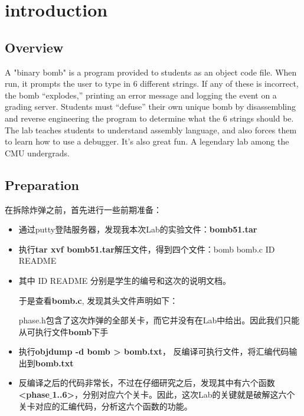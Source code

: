 \section{introduction}
	\subsection{Overview}
	A "binary bomb" is a program provided to students as an object code file. When run, it prompts the user to type in 6 different strings. If any of these is incorrect, the bomb ``explodes,'' printing an error message and logging the event on a grading server. Students must ``defuse'' their own unique bomb by disassembling and reverse engineering the program to determine what the 6 strings should be. The lab teaches students to understand assembly language, and also forces them to learn how to use a debugger. It's also great fun. A legendary lab among the CMU undergrads.
	\subsection{Preparation}
	在拆除炸弹之前，首先进行一些前期准备：
	\begin{itemize}
		\item	通过putty登陆服务器，发现我本次Lab的实验文件：\textbf{bomb51.tar}
		\item	执行\textbf{tar xvf bomb51.tar}解压文件，得到四个文件：bomb bomb.c ID README
		\item	其中 ID README 分别是学生的编号和这次的说明文档。
		
				于是查看\textbf{bomb.c}, 发现其头文件声明如下：
				
				
				phase.h包含了这次炸弹的全部关卡，而它并没有在Lab中给出。因此我们只能从可执行文件\textbf{bomb}下手
		\item	执行\textbf{objdump -d bomb > bomb.txt}， 反编译可执行文件，将汇编代码输出到\textbf{bomb.txt}
		\item	反编译之后的代码非常长，不过在仔细研究之后，发现其中有六个函数\textbf{<phase$\_$1..6>}，分别对应六个关卡。因此，这次Lab的关键就是破解这六个关卡对应的汇编代码，分析这六个函数的功能。
	\end{itemize}